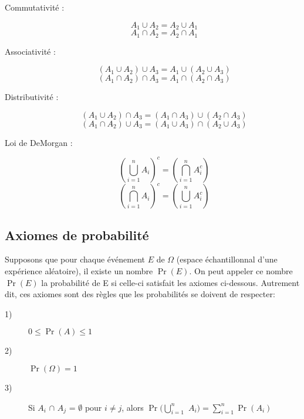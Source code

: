 \documentclass[10pt, french]{article}
\begin{document}
\begin{multicols*}{2}
\begin{definitionNOHFILLprop}
\begin{description}
  \item[Commutativité :] 
  $$A_1	\cup	A_2	=	A_2 \cup A_1$$ $$A_1	\cap	A_2	=	A_2 \cap A_1$$
  \item[Associativité :] $$(A_1 \cup A_2)	\cup A_3	=	A_1 \cup		(A_2 \cup A_3)$$ $$(A_1 \cap A_2)	\cap A_3	=	A_1 \cap		(A_2 \cap A_3)$$
  \item[Distributivité :] $$(A_1 \cup A_2)	\cap A_3 = (A_1 \cap A_3) \cup (A_2 \cap A_3)$$ $$(A_1 \cap A_2)	\cup A_3 = (A_1 \cup A_3) \cap (A_2 \cup A_3)$$
  \item[Loi de DeMorgan :] $$(\bigcup_{i = 1}^{n} A_{i})^{c} = (\bigcap_{i=1}^{n} A_i^{c})$$ $$(\bigcap_{i = 1}^{n} A_{i})^{c} = (\bigcup_{i=1}^{n} A_i^{c})$$
\end{description}
\end{definitionNOHFILLprop}
\vfill\null
\columnbreak

\subsection{Axiomes de probabilité}
\begin{definitionNOHFILLprop}
Supposons que pour chaque événement $E$ de $\Omega$ (espace échantillonnal d'une expérience aléatoire), il existe un nombre $\Pr(E)$. On peut appeler ce nombre $\Pr(E)$ la probabilité de E si celle-ci satisfait les axiomes ci-dessous. Autrement dit, ces axiomes sont des règles que les probabilités se doivent de respecter: 

\begin{description}
  \item[1)] $0 \leq \Pr(A) \leq 1$
  \item[2)] $\Pr(\Omega)=1$
  \item[3)] Si $A_i$ $\cap$ $A_j$ = $\emptyset$ pour $i \neq j$, alors $\Pr(\bigcup_{i = 1}^{n}$ $A_i) = \sum_{i = 1}^{n} \Pr(A_i)$
\end{description}
\end{definitionNOHFILLprop}

\begin{definitionNOHFILLprop}


\end{definitionNOHFILLprop}
\end{multicols*}
\end{document}
